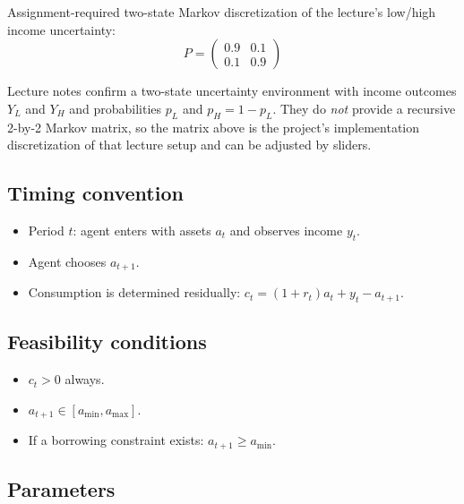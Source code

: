 \documentclass[11pt]{article}
\begin{document}
Assignment-required two-state Markov discretization of the lecture's low/high income uncertainty:
\[
P = \begin{pmatrix} 0.9 & 0.1 \\ 0.1 & 0.9 \end{pmatrix}
\]

\begin{notebox}
Lecture notes confirm a two-state uncertainty environment with income outcomes $Y_L$ and $Y_H$ and probabilities $p_L$ and $p_H = 1-p_L$. They do \emph{not} provide a recursive 2-by-2 Markov matrix, so the matrix above is the project's implementation discretization of that lecture setup and can be adjusted by sliders.
\end{notebox}

\subsection{Timing convention}
\begin{itemize}
    \item Period $t$: agent enters with assets $a_t$ and observes income $y_t$.
    \item Agent chooses $a_{t+1}$.
    \item Consumption is determined residually: $c_t = (1+r_t)a_t + y_t - a_{t+1}$.
\end{itemize}

\subsection{Feasibility conditions}
\begin{itemize}
    \item $c_t > 0$ always.
    \item $a_{t+1} \in [a_{\min}, a_{\max}]$.
    \item If a borrowing constraint exists: $a_{t+1} \geq a_{\min}$.
\end{itemize}

\subsection{Parameters}
\end{document}
